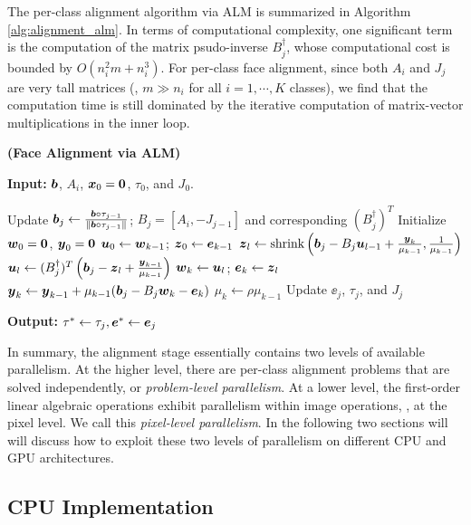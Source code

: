 \documentclass[10pt,twocolumn,letterpaper]{article}
\begin{document}
The per-class alignment algorithm via ALM is summarized in Algorithm
\ref{alg:alignment_alm}. In terms of computational complexity, one significant
term is the computation of the matrix psudo-inverse $B_j^\dagger$, whose
computational cost is bounded by $O(n_i^2m + n_i^3)$. For per-class face
alignment, since both $A_i$ and $J_{j}$ are very tall matrices (\ie, $m\gg n_i$
for all $i=1, \cdots, K$ classes), we find that the computation time is still
dominated by the iterative computation of matrix-vector multiplications in the
inner loop.
\begin{algorithm}[ht!]
\caption{\bf (Face Alignment via ALM)} \label{alg:alignment_alm}
{\bf Input:} ${\boldsymbol{b}}$, $A_i$, ${\boldsymbol{x}}_0 = \boldsymbol{0}$, $\tau_0$, and $J_0$.
\begin{algorithmic}[1]
\STATE Update ${\boldsymbol{b}}_j \leftarrow \frac{{\boldsymbol{b}}\circ \tau_{j-1}}{\|{\boldsymbol{b}}\circ \tau_{j-1}\|}$; $B_j= [A_i, -J_{j-1}]$ and corresponding $(B_j^\dagger)^T$
\STATE Initialize ${\boldsymbol{w}}_0 = \boldsymbol 0$, ${\boldsymbol{y}}_0 = \boldsymbol 0$
\STATE ${\boldsymbol{u}}_0\leftarrow {\boldsymbol{w}}_{k-1}$; ${\boldsymbol{z}}_0\leftarrow {\boldsymbol{e}}_{k-1}$
\STATE ${\boldsymbol{z}}_l \leftarrow \mbox{shrink}\left({\boldsymbol{b}}_j - B_j{\boldsymbol{u}}_{l-1} + \frac{{\boldsymbol{y}}_{k}}{\mu_{k-1}}, \frac{1}{\mu_{k-1}}\right)$
\STATE ${\boldsymbol{u}}_l \leftarrow (B_j^\dagger)^T \left({\boldsymbol{b}}_j - {\boldsymbol{z}}_{l} + \frac{{\boldsymbol{y}}_{k-1}}{\mu_{k-1}} \right) $
\ENDWHILE
\STATE ${\boldsymbol{w}}_k \leftarrow {\boldsymbol{u}}_l$; ${\boldsymbol{e}}_k \leftarrow {\boldsymbol{z}}_l$
\STATE ${\boldsymbol{y}}_{k} \leftarrow {\boldsymbol{y}}_{k-1} + \mu_{k-1} ({\boldsymbol{b}}_j - B_j{\boldsymbol{w}}_{k} - \boldsymbol{e}_{k})$
\STATE $\mu_{k} \leftarrow \rho\mu_{k-1}$
\ENDWHILE
\STATE Update $\ee_j$, $\tau_j$, and $J_j$
\ENDWHILE
\end{algorithmic}
{\bf Output:} $\tau^*\leftarrow \tau_j, \boldsymbol{e}^*\leftarrow {\boldsymbol{e}}_j$
\end{algorithm}

In summary, the alignment stage essentially contains two levels of available
parallelism. At the higher level, there are per-class alignment problems
that are solved independently, or \emph{problem-level parallelism}.  At a lower
level, the first-order linear algebraic operations exhibit parallelism within
image operations, \ie, at the pixel level.  We call this \emph{pixel-level
parallelism}.  In the following two sections will will discuss how to
exploit these two levels of parallelism on different CPU and GPU architectures.

\subsection{CPU Implementation} 
\label{sec:alignment_implementation_cpu}
\end{document}

